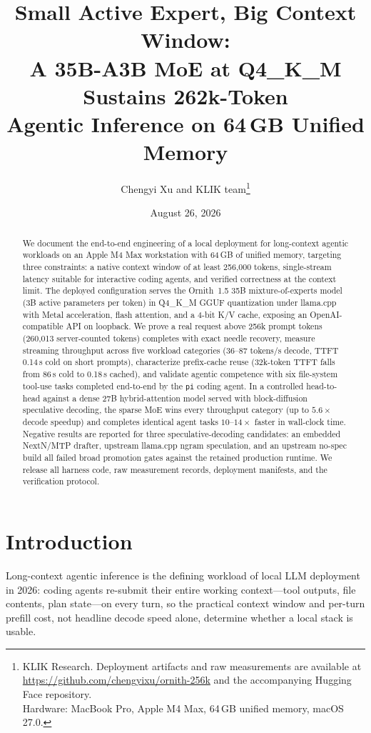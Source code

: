 \documentclass[11pt]{article}
\title{\textbf{Small Active Expert, Big Context Window:\\ A 35B-A3B MoE at Q4\_K\_M Sustains 262k-Token\\ Agentic Inference on 64\,GB Unified Memory}}
\author{Chengyi Xu and KLIK team\thanks{KLIK Research. Deployment artifacts and raw measurements are available at\\
\url{https://github.com/chengyixu/ornith-256k} and the accompanying Hugging Face repository.\\
Hardware: MacBook Pro, Apple M4 Max, 64\,GB unified memory, macOS 27.0.}}
\date{August 26, 2026}
\newcommand{\ornith}{Ornith~1.5}
\newcommand{\llamacpp}{llama.cpp}
\begin{document}
\maketitle

\begin{abstract}
We document the end-to-end engineering of a local deployment for long-context
agentic workloads on an Apple M4 Max workstation with 64\,GB of unified memory,
targeting three constraints: a native context window of at least 256{,}000
tokens, single-stream latency suitable for interactive coding agents, and
verified correctness at the context limit. The deployed configuration serves
the \ornith{} 35B mixture-of-experts model (3B active parameters per token) in
Q4\_K\_M GGUF quantization under \llamacpp{} with Metal acceleration, flash
attention, and a 4-bit K/V cache, exposing an OpenAI-compatible API on
loopback. We prove a real request above 256k prompt tokens (260{,}013
server-counted tokens) completes with exact needle recovery, measure streaming
throughput across five workload categories (36--87 tokens/s decode, TTFT
0.14\,s cold on short prompts), characterize prefix-cache reuse (32k-token
TTFT falls from 86\,s cold to 0.18\,s cached), and validate agentic competence
with six file-system tool-use tasks completed end-to-end by the \texttt{pi}
coding agent. In a controlled head-to-head against a dense 27B hybrid-attention
model served with block-diffusion speculative decoding, the sparse MoE wins
every throughput category (up to $5.6\times$ decode speedup) and completes
identical agent tasks $10$--$14\times$ faster in wall-clock time. Negative
results are reported for three speculative-decoding candidates: an embedded
NextN/MTP drafter, upstream \llamacpp{} ngram speculation, and an upstream
no-spec build all failed broad promotion gates against the retained production
runtime. We release all harness code, raw measurement records, deployment
manifests, and the verification protocol.
\end{abstract}

\section{Introduction}

Long-context agentic inference is the defining workload of local LLM
deployment in 2026: coding agents re-submit their entire working context---tool
outputs, file contents, plan state---on every turn, so the practical context
window and per-turn prefill cost, not headline decode speed alone, determine
whether a local stack is usable.
\end{document}
